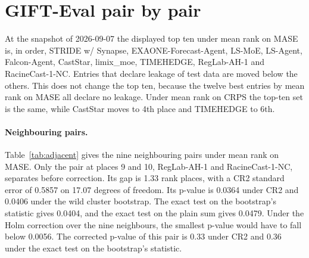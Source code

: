 \documentclass{article}
\begin{document}
\section{GIFT-Eval pair by pair}
\label{app:gaps}

At the snapshot of 2026-09-07 the displayed top ten under mean rank on MASE is, in order,
STRIDE w/ Synapse, EXAONE-Forecast-Agent, LS-MoE, LS-Agent, Falcon-Agent, CastStar,
limix\_moe, TIMEHEDGE, RegLab-AH-1 and RacineCast-1-NC. Entries that declare leakage of
test data are moved below the others. This does not change the top ten, because the twelve
best entries by mean rank on MASE all declare no leakage. Under mean rank on CRPS the top-ten
set is the same, while CastStar moves to 4th place and TIMEHEDGE to 6th.

\paragraph{Neighbouring pairs.} Table~\ref{tab:adjacent} gives the nine neighbouring pairs
under mean rank on MASE. Only the pair at places 9 and 10, RegLab-AH-1 and RacineCast-1-NC,
separates before correction. Its gap is 1.33 rank places, with a CR2 standard error of 0.5857
on 17.07 degrees of freedom. Its p-value is 0.0364 under CR2 and 0.0406 under the wild cluster
bootstrap. The exact test on the bootstrap's statistic gives 0.0404, and the exact test on the
plain sum gives 0.0479. Under the Holm correction over the nine neighbours, the smallest
p-value would have to fall below 0.0056. The corrected p-value of this pair is 0.33 under CR2
and 0.36 under the exact test on the bootstrap's statistic.
\end{document}
